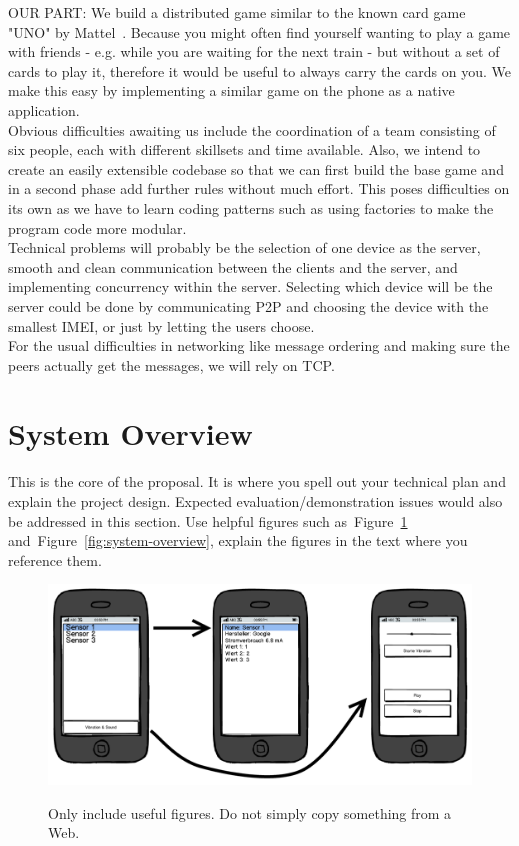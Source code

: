 \documentclass{report}
\newcommand{\lfig}[1]{\label{fig:#1}}
\newcommand{\rfig}[1]{Figure~\ref{fig:#1}}
\begin{document}
OUR PART:
We build a distributed game similar to the known card game "UNO" by Mattel~\cite{unoshop}. Because you might often find yourself wanting to play a game with friends - e.g. while you are waiting for the next train - but without a set of cards to play it, therefore it would be useful to always carry the cards on you. We make this easy by implementing a similar game on the phone as a native application.\\

Obvious difficulties awaiting us include the coordination of a team consisting of six people, each with different skillsets and time available.
Also, we intend to create an easily extensible codebase so that we can first build the base game and in a second phase add further rules without much effort. This poses difficulties on its own as we have to learn coding patterns such as using factories to make the program code more modular.\\
Technical problems will probably be the selection of one device as the server, smooth and clean communication between the clients and the server, and implementing concurrency within the server. Selecting which device will be the server could be done by communicating P2P and choosing the device with the smallest IMEI, or just by letting the users choose.\\

For the usual difficulties in networking like message ordering and making sure the peers actually get the messages, we will rely on TCP.


\section{System Overview}

This is the core of the proposal.
It is where you spell out your technical plan and explain the project design.
Expected evaluation/demonstration issues would also be addressed in this section.
Use helpful figures such as~\rfig{example} and~\rfig{system-overview},
explain the figures in the text where you reference them. 


\begin{figure}[h]
	\centering
    \includegraphics[width=\columnwidth]{example}
    \lfig{example}
    \vspace{-5mm} %
\caption{Only include useful figures. Do not simply copy something from a Web.}
\end{figure}
\end{document}
